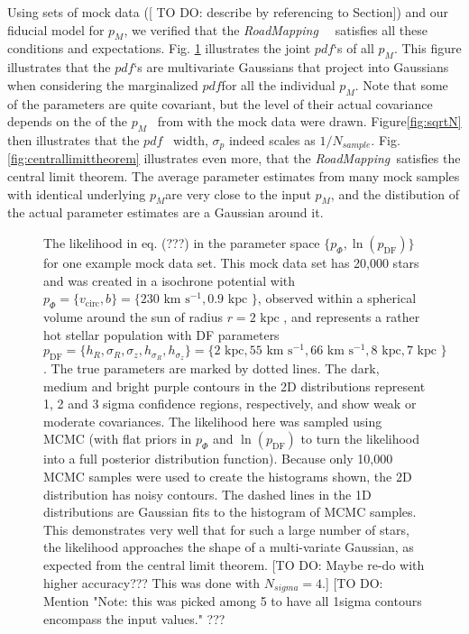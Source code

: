 \documentclass[12pt,preprint]{aastex}
\newcommand{\pdf}{\ensuremath{pdf}}
\newcommand{\pmodel}{\ensuremath{p_M}}
\newcommand{\RM}{{\sl RoadMapping~}}
\begin{document}
 Using sets of mock data ([ TO DO: describe by referencing to Section]) and our fiducial model for \pmodel , we verified that the \RM~ satisfies all these conditions and expectations. Fig. \ref{fig:triangleplot} illustrates the joint \pdf `s of all \pmodel . This figure illustrates that the \pdf `s are multivariate Gaussians that project into Gaussians when considering the marginalized \pdf for all the individual \pmodel . Note that some of the parameters are quite covariant, but the level of their actual covariance depends on the of the \pmodel~ from with the mock data were drawn.  Figure\ref{fig:sqrtN} then illustrates that the \pdf~ width, $\sigma_p$ indeed scales as $1/N_{sample}$.
Fig.\ref{fig:centrallimittheorem} illustrates even more, that the \RM satisfies the central limit theorem. The average parameter estimates from many mock samples with identical underlying \pmodel are very close to the input \pmodel , and the distibution of the actual parameter estimates are a Gaussian around it. 



\begin{figure}
\caption{The likelihood in eq. (???) in the parameter space $\{p_\Phi,\ln(p_\text{DF})\}$ for one example mock data set. This mock data set has 20,000 stars and was created in a isochrone potential with $p_\Phi = \{v_\text{circ},b \}=\{230 \text{ km s$^{-1}$},0.9\text{ kpc } \}$, observed within a spherical volume around the sun of radius $r = 2 \text{ kpc }$, and represents a rather hot stellar population with DF parameters $p_\text{DF} = \{ h_R, \sigma_R, \sigma_z,h_{\sigma_R},h_{\sigma_z}\} =\{2 \text{ kpc}, 55 \text{ km s$^{-1}$}, 66 \text{ km s$^{-1}$}, 8 \text{ kpc}, 7 \text{ kpc }\} $.  The true parameters are marked by dotted lines. The dark, medium and bright purple contours in the 2D distributions represent 1, 2 and 3 sigma confidence regions, respectively, and show weak or moderate covariances. The likelihood here was sampled using MCMC (with flat priors in $p_\Phi$ and  $\ln(p_\text{DF})$ to turn the likelihood into a full posterior distribution function). Because only 10,000 MCMC samples were used to create the histograms shown, the 2D distribution has noisy contours. The dashed lines in the 1D distributions are Gaussian fits to the histogram of MCMC samples. This demonstrates very well that for such a large number of stars, the likelihood approaches the shape of a multi-variate Gaussian, as expected from the central limit theorem. [TO DO: Maybe re-do with higher accuracy??? This was done with $N_{sigma} = 4$.] [TO DO: Mention "Note: this was picked among 5 to have all 1sigma contours encompass the input values." ???}
\label{fig:triangleplot}
\end{figure}
\end{document}
